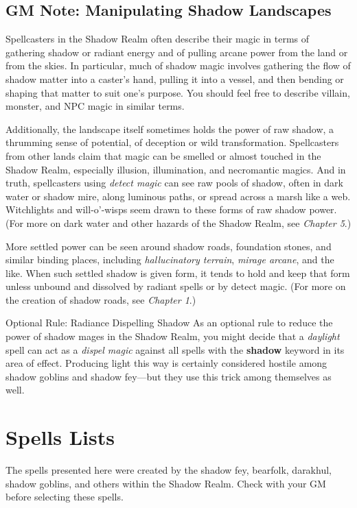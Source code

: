 \documentclass[10pt,a4paper,twoside,bg=print,twocolumn,openany,nodeprecatedcode]{dndbook}
\begin{document}
\subsection{GM Note: Manipulating Shadow Landscapes}
Spellcasters in the Shadow Realm often describe their magic in terms of gathering shadow or radiant energy and of pulling arcane power from the land or from the skies. In particular, much of shadow magic involves gathering the flow of shadow matter into a caster's hand, pulling it into a vessel, and then bending or shaping that matter to suit one's purpose. You should feel free to describe villain, monster, and NPC magic in similar terms.

Additionally, the landscape itself sometimes holds the power of raw shadow, a thrumming sense of potential, of deception or wild transformation. Spellcasters from other lands claim that magic can be smelled or almost touched in the Shadow Realm, especially illusion, illumination, and necromantic magics. And in truth, spellcasters using \textit{detect magic} can see raw pools of shadow, often in dark water or shadow mire, along luminous paths, or spread across a marsh like a web. Witchlights and will-o'-wisps seem drawn to these forms of raw shadow power. (For more on dark water and other hazards of the Shadow Realm, see \textit{Chapter 5}.)

More settled power can be seen around shadow roads, foundation stones, and similar binding places, including \textit{hallucinatory terrain}, \textit{mirage arcane}, and the like. When such settled shadow is given form, it tends to hold and keep that form unless unbound and dissolved by radiant spells or by detect magic. (For more on the creation of shadow roads, see \textit{Chapter 1}.)

\begin{DndSidebar}[float=!b]{Optional Rule: Radiance Dispelling Shadow}
As an optional rule to reduce the power of shadow mages in the Shadow Realm, you might decide that a \textit{daylight} spell can act as a \textit{dispel magic} against all spells with the \textbf{shadow} keyword in its area of effect. Producing light this way is certainly considered hostile among shadow goblins and shadow fey—but they use this trick among themselves as well.



\end{DndSidebar}

\section{Spells Lists}
The spells presented here were created by the shadow fey, bearfolk, darakhul, shadow goblins, and others within the Shadow Realm. Check with your GM before selecting these spells.
\end{document}
